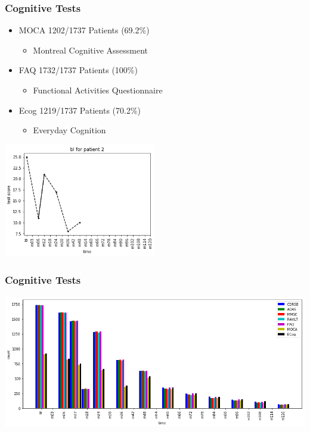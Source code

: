 \documentclass{beamer}
\begin{document}
    \begin{frame}
        \frametitle{Cognitive Tests}
        \begin{itemize}
            \item MOCA \hfill 1202/1737 Patients (69.2\%)
                \begin{itemize}
                \item Montreal Cognitive Assessment
                \end{itemize}
            \item FAQ \hfill 1732/1737 Patients (100\%)
                \begin{itemize}
                    \item Functional Activities Questionnaire
                \end{itemize}
            \item Ecog \hfill 1219/1737 Patients (70.2\%)
                \begin{itemize}
                    \item Everyday Cognition
                \end{itemize}
        \end{itemize}
        \begin{center}
            \includegraphics[width=0.5\textwidth]{images/cog_test.png}
        \end{center}
    \end{frame}

    \begin{frame}
        \frametitle{Cognitive Tests}
        \begin{center}
            \includegraphics[width=\textwidth]{images/cog_times.png}
        \end{center}
    \end{frame}
\end{document}
